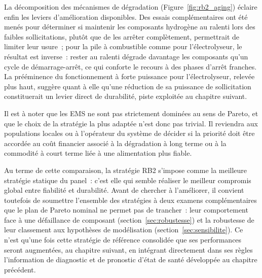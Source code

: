La décomposition des mécanismes de dégradation (Figure~\ref{fig:rb2_aging}) éclaire enfin les leviers d'amélioration disponibles. Des essais complémentaires ont été menés pour déterminer si maintenir les composants hydrogène au ralenti lors des faibles sollicitations, plutôt que de les arrêter complètement, permettrait de limiter leur usure~; pour la pile à combustible comme pour l'électrolyseur, le résultat est inverse~: rester au ralenti dégrade davantage les composants qu'un cycle de démarrage-arrêt, ce qui conforte le recours à des phases d'arrêt franches. La prééminence du fonctionnement à forte puissance pour l'électrolyseur, relevée plus haut, suggère quant à elle qu'une réduction de sa puissance de sollicitation constituerait un levier direct de durabilité, piste exploitée au chapitre suivant.

Il est à noter que les EMS ne sont pas strictement dominées au sens de Pareto, et que le choix de la stratégie la plus adaptée n'est donc pas trivial. Il reviendra aux populations locales ou à l'opérateur du système de décider si la priorité doit être accordée au coût financier associé à la dégradation à long terme ou à la commodité à court terme liée à une alimentation plus fiable.

Au terme de cette comparaison, la stratégie RB2 s'impose comme la meilleure stratégie statique du panel~: c'est elle qui semble réaliser le meilleur compromis global entre fiabilité et durabilité. Avant de chercher à l'améliorer, il convient toutefois de soumettre l'ensemble des stratégies à deux examens complémentaires que le plan de Pareto nominal ne permet pas de trancher~: leur comportement face à une défaillance de composant (section~\ref{sec:robustesse}) et la robustesse de leur classement aux hypothèses de modélisation (section~\ref{sec:sensibilite}). Ce n'est qu'une fois cette stratégie de référence consolidée que ses performances seront augmentées, au chapitre suivant, en intégrant directement dans ses règles l'information de diagnostic et de pronostic d'état de santé développée au chapitre précédent.